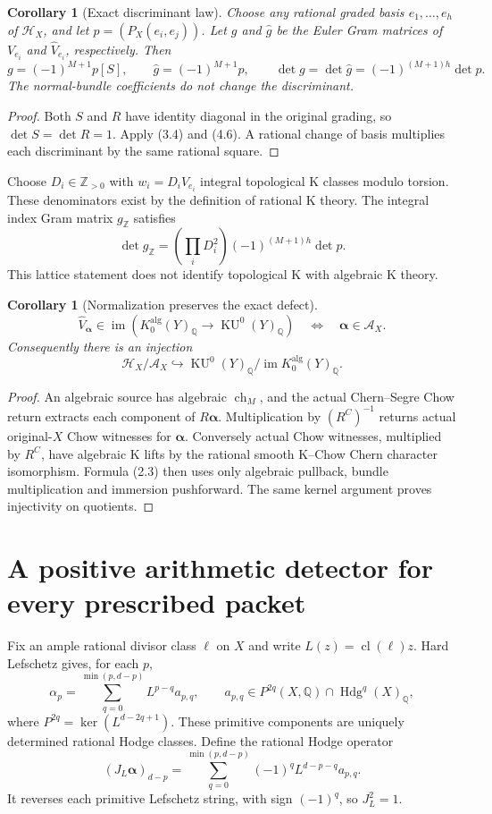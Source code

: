 \documentclass[11pt]{article}
\newcommand{\Q}{\mathbb Q}
\newcommand{\Z}{\mathbb Z}
\newcommand{\Hdg}{\operatorname{Hdg}}
\newcommand{\ch}{\operatorname{ch}}
\newcommand{\cl}{\operatorname{cl}}
\newcommand{\KU}{\operatorname{KU}}
\newcommand{\im}{\operatorname{im}}
\newtheorem{corollary}[theorem]{Corollary}
\begin{document}
\begin{corollary}[Exact discriminant law]
Choose any rational graded basis $e_1,\ldots,e_h$ of $\mathcal H_X$,
and let $p=(P_X(e_i,e_j))$. Let $g$ and $\widehat g$ be the Euler
Gram matrices of $V_{e_i}$ and $\widehat V_{e_i}$, respectively.
Then
\[
 g=(-1)^{M+1}p[S],\qquad
 \widehat g=(-1)^{M+1}p,\qquad
 \boxed{\det g=\det\widehat g
           =(-1)^{(M+1)h}\det p.}
 \tag{4.7}
\]
The normal-bundle coefficients do not change the discriminant.
\end{corollary}
\begin{proof}
Both $S$ and $R$ have identity diagonal in the original grading,
so $\det S=\det R=1$. Apply (3.4) and (4.6).
A rational change of basis multiplies each discriminant by the
same rational square.
\end{proof}

Choose $D_i\in\Z_{>0}$ with $w_i=D_i\widehat V_{e_i}$ integral
topological K classes modulo torsion. These denominators exist
by the definition of rational K theory. The integral index Gram
matrix $g_{\Z}$ satisfies
\[
 \boxed{\det g_{\Z}
       =\left(\prod_iD_i^2\right)
          (-1)^{(M+1)h}\det p.}
 \tag{4.8}
\]
This lattice statement does not identify topological K with
algebraic K theory.

\begin{corollary}[Normalization preserves the exact defect]
\[
 \widehat V_{\boldsymbol\alpha}
      \in\im(K_0^{\mathrm{alg}}(Y)_{\Q}\to\KU^0(Y)_{\Q})
 \quad\Longleftrightarrow\quad
 \boldsymbol\alpha\in\mathcal A_X.
 \tag{4.9}
\]
Consequently there is an injection
\[
 \mathcal H_X/\mathcal A_X
   \hookrightarrow
   \KU^0(Y)_{\Q}/\im K_0^{\mathrm{alg}}(Y)_{\Q}.
 \tag{4.10}
\]
\end{corollary}
\begin{proof}
An algebraic source has algebraic $\ch_M$, and the actual
Chern--Segre Chow return extracts each component of
$R\boldsymbol\alpha$. Multiplication by $(R^C)^{-1}$ returns
actual original-$X$ Chow witnesses for $\boldsymbol\alpha$.
Conversely actual Chow witnesses, multiplied by $R^C$, have
algebraic K lifts by the rational smooth K--Chow Chern character
isomorphism. Formula (2.3) then uses only algebraic pullback,
bundle multiplication and immersion pushforward.
The same kernel argument proves injectivity on quotients.
\end{proof}

\section{A positive arithmetic detector for every prescribed packet}
Fix an ample rational divisor class $\ell$ on $X$ and write
$L(z)=\cl(\ell)z$. Hard Lefschetz gives, for each $p$,
\[
 \alpha_p=\sum_{q=0}^{\min(p,d-p)}L^{p-q}a_{p,q},\qquad
 a_{p,q}\in P^{2q}(X,\Q)\cap\Hdg^q(X)_{\Q},
 \tag{5.1}
\]
where $P^{2q}=\ker(L^{d-2q+1})$. These primitive components
are uniquely determined rational Hodge classes.
Define the rational Hodge operator
\[
 \boxed{(J_L\boldsymbol\alpha)_{d-p}
     =\sum_{q=0}^{\min(p,d-p)}
             (-1)^q L^{d-p-q}a_{p,q}.}
 \tag{5.2}
\]
It reverses each primitive Lefschetz string, with sign $(-1)^q$,
so $J_L^2=1$.
\end{document}
